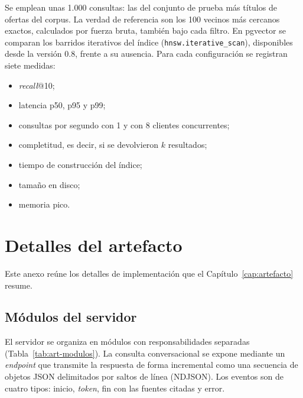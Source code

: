 Se emplean unas 1.000 consultas: las del conjunto de prueba más títulos de ofertas del corpus. La verdad de referencia son los 100 vecinos más cercanos exactos, calculados por fuerza bruta, también bajo cada filtro. En pgvector se comparan los barridos iterativos del índice (\texttt{hnsw.\allowbreak iterative\_scan}), disponibles desde la versión 0.8, frente a su ausencia. Para cada configuración se registran siete medidas:
\begin{itemize}
    \item \textit{recall}@10;
    \item latencia p50, p95 y p99;
    \item consultas por segundo con 1 y con 8 clientes concurrentes;
    \item completitud, es decir, si se devolvieron $k$ resultados;
    \item tiempo de construcción del índice;
    \item tamaño en disco;
    \item memoria pico.
\end{itemize}

\chapter{Detalles del artefacto}
\label{anx:artefacto}

Este anexo reúne los detalles de implementación que el Capítulo~\ref{cap:artefacto} resume.

\section{Módulos del servidor}

El servidor se organiza en módulos con responsabilidades separadas (Tabla~\ref{tab:art-modulos}). La consulta conversacional se expone mediante un \textit{endpoint} que transmite la respuesta de forma incremental como una secuencia de objetos JSON delimitados por saltos de línea (NDJSON). Los eventos son de cuatro tipos: inicio, \textit{token}, fin con las fuentes citadas y error.

